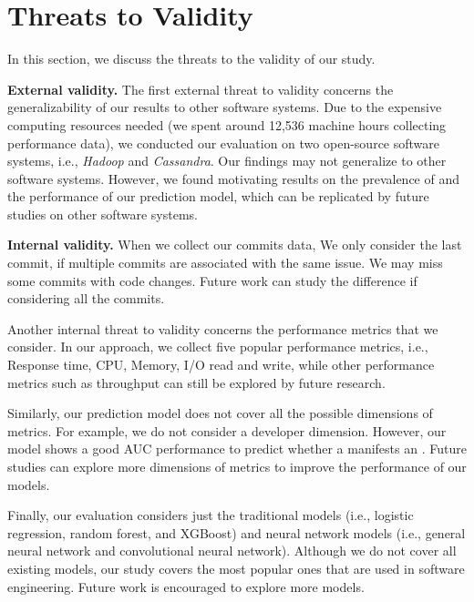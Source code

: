 
\section{Threats to Validity}
\label{sec:threats}
In this section, we discuss the threats to the validity of our study. 

\noindent \textbf{External validity.} The first external threat to validity concerns the generalizability of our results to other software systems. Due to the expensive computing resources needed (we spent around 12,536 machine hours collecting performance data), we conducted our evaluation on two open-source software systems, i.e., \emph{Hadoop} and \emph{Cassandra}. Our findings may not generalize to other software systems. %
However, we found motivating results on the prevalence of \inconsistent and the performance of our prediction model, which can be replicated by future studies on other software systems. %

\noindent \textbf{Internal validity.}
When we collect our commits data, We only consider the last commit, if multiple commits are associated with the same issue. We may miss some commits with code changes. Future work can study the difference if considering all the commits.

Another internal threat to validity concerns the performance metrics that we consider. In our approach, we collect five popular performance metrics, i.e., Response time, CPU, Memory, I/O read and write, while other performance metrics such as throughput can still be explored by future research.%


Similarly, our prediction model does not cover all the possible dimensions of metrics. For example, we do not consider a developer dimension. However, our model shows a good AUC performance to predict whether a \instance manifests an \inconsistent. Future studies can explore more dimensions of metrics to improve the performance of our models. 

Finally, our evaluation considers just the traditional models (i.e., logistic regression, random forest, and XGBoost) and neural network models (i.e., general neural network and convolutional neural network). Although we do not cover all existing models, our study covers the most popular ones that are used in software engineering. Future work is encouraged to explore more models. 


